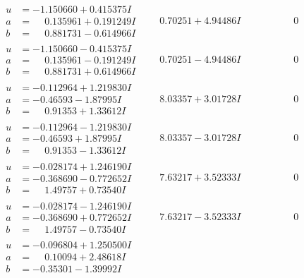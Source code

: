 \documentclass[1p]{elsarticle_modified}
\theoremstyle{definition}
\begin{document}
$$\begin{array}{c|c|c}
\begin{aligned}
u &= -1.150660 + 0.415375 I \\
a &= \phantom{-}0.135961 + 0.191249 I \\
b &= \phantom{-}0.881731 - 0.614966 I\end{aligned}
 & \phantom{-}0.70251 + 4.94486 I & \phantom{-0.000000 } 0 \\ \hline\begin{aligned}
u &= -1.150660 - 0.415375 I \\
a &= \phantom{-}0.135961 - 0.191249 I \\
b &= \phantom{-}0.881731 + 0.614966 I\end{aligned}
 & \phantom{-}0.70251 - 4.94486 I & \phantom{-0.000000 } 0 \\ \hline\begin{aligned}
u &= -0.112964 + 1.219830 I \\
a &= -0.46593 - 1.87995 I \\
b &= \phantom{-}0.91353 + 1.33612 I\end{aligned}
 & \phantom{-}8.03357 + 3.01728 I & \phantom{-0.000000 } 0 \\ \hline\begin{aligned}
u &= -0.112964 - 1.219830 I \\
a &= -0.46593 + 1.87995 I \\
b &= \phantom{-}0.91353 - 1.33612 I\end{aligned}
 & \phantom{-}8.03357 - 3.01728 I & \phantom{-0.000000 } 0 \\ \hline\begin{aligned}
u &= -0.028174 + 1.246190 I \\
a &= -0.368690 - 0.772652 I \\
b &= \phantom{-}1.49757 + 0.73540 I\end{aligned}
 & \phantom{-}7.63217 + 3.52333 I & \phantom{-0.000000 } 0 \\ \hline\begin{aligned}
u &= -0.028174 - 1.246190 I \\
a &= -0.368690 + 0.772652 I \\
b &= \phantom{-}1.49757 - 0.73540 I\end{aligned}
 & \phantom{-}7.63217 - 3.52333 I & \phantom{-0.000000 } 0 \\ \hline\begin{aligned}
u &= -0.096804 + 1.250500 I \\
a &= \phantom{-}0.10094 + 2.48618 I \\
b &= -0.35301 - 1.39992 I\end{aligned}

\end{array}$$
\end{document}
